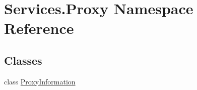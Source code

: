 \hypertarget{namespace_services_1_1_proxy}{}\section{Services.\+Proxy Namespace Reference}
\label{namespace_services_1_1_proxy}
\subsection*{Classes}
\begin{DoxyCompactItemize}
\item 
class \hyperlink{class_services_1_1_proxy_1_1_proxy_information}{Proxy\+Information}
\end{DoxyCompactItemize}
